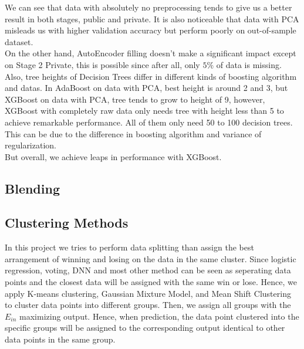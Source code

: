 \documentclass[12pt,a4paper]{article}
\begin{document}
We can see that data with absolutely no preprocessing tends to give us a better result in both stages, public and private. It is also noticeable that data with PCA misleads us with higher validation accuracy but perform poorly on out-of-sample dataset. \\
On the other hand, AutoEncoder filling doesn't make a significant impact except on Stage 2 Private, this is possible since after all, only $5\%$ of data is missing.\\
Also, tree heights of Decision Trees differ in different kinds of boosting algorithm and datas. In AdaBoost on data with PCA, best height is around 2 and 3, but XGBoost on data with PCA, tree tends to grow to height of 9, however, XGBoost with completely raw data only needs tree with height less than 5 to achieve remarkable performance. All of them only need 50 to 100 decision trees. This can be due to the difference in boosting algorithm and variance of regularization.\\
But overall, we achieve leaps in performance with XGBoost.



\subsection{Blending}


\subsection{Clustering Methods}
In this project we tries to perform data splitting than assign the best arrangement of winning and losing on the data in the same cluster.
Since logistic regression, voting, DNN and most other method can be seen as seperating data points and the closest data will be assigned with the same win or lose.
Hence, we apply K-means clustering, Gaussian Mixture Model, and Mean Shift Clustering to cluster data points into different groups.
Then, we assign all groups with the $E_{in}$ maximizing output.
Hence, when prediction, the data point clustered into the specific groups will be assigned to the corresponding output identical to other data points in the same group.
\end{document}

